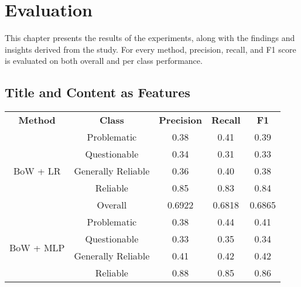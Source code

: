 \chapter{Evaluation}
\label{cha:5}


This chapter presents the results of the experiments, along with the findings and insights derived from the study. For every method, precision, recall, and F1 score is evaluated on both overall and per class performance.

\section{Title and Content as Features}

\begin{table}[htbp]
    \centering
    \scriptsize
    \begin{longtable}{| c | c | c | c | c |}
        \hline                            \textbf{Method} & \textbf{Class}     & \textbf{Precision} & \textbf{Recall} & \textbf{F1}     \\\cline{1-5}
        \multirow{5}{*}{BoW + LR}                         & Problematic        & 0.38               & 0.41            & 0.39            \\
                                                          & Questionable       & 0.34               & 0.31            & 0.33            \\
                                                          & Generally Reliable & 0.36               & 0.40            & 0.38            \\
                                                          & Reliable           & 0.85               & 0.83            & 0.84            \\\cline{2-5}
                                                          & Overall            & 0.6922             & 0.6818          & 0.6865          \\
        \hline
        \multirow{5}{*}{BoW + MLP}                        & Problematic        & 0.38               & 0.44            & 0.41            \\
                                                          & Questionable       & 0.33               & 0.35            & 0.34            \\
                                                          & Generally Reliable & 0.41               & 0.42            & 0.42            \\
                                                          & Reliable           & 0.88               & 0.85            & 0.86            \\\cline{2-5}

\end{longtable}
\end{table}
